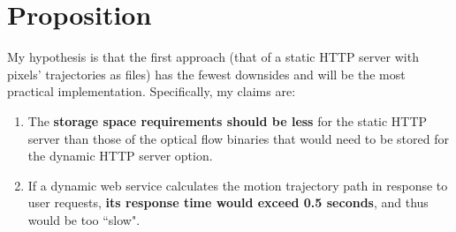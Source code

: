 \section{Proposition}
\label{hypothesis}
My hypothesis is that the first approach (that of a static HTTP server with pixels' trajectories as files) has the fewest downsides and will be the most practical implementation. Specifically, my claims are:
\begin{enumerate}
\item The \textbf{storage space requirements should be less} for the static HTTP server than those of the optical flow binaries that would need to be stored for the dynamic HTTP server option.
\item If a dynamic web service calculates the motion trajectory path in response to user requests, \textbf{its response time would exceed 0.5 seconds}, and thus would be too ``slow".
\end{enumerate}


